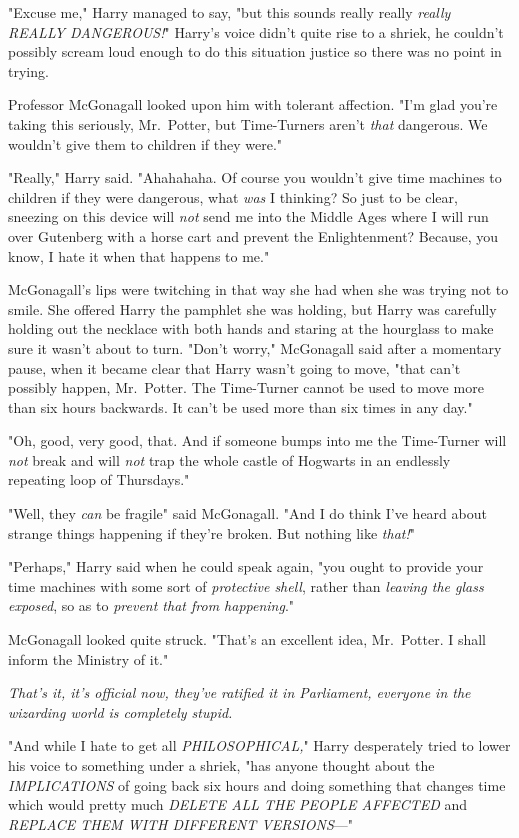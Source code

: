 "Excuse me," Harry managed to say, "but this sounds really really \emph{really
REALLY DANGEROUS!}" Harry's voice didn't quite rise to a shriek, he couldn't
possibly scream loud enough to do this situation justice so there was no point
in trying.

Professor McGonagall looked upon him with tolerant affection. "I'm glad you're
taking this seriously, Mr.~Potter, but Time-Turners aren't \emph{that}
dangerous. We wouldn't give them to children if they were."

"Really," Harry said. "Ahahahaha. Of course you wouldn't give time machines to
children if they were dangerous, what \emph{was} I thinking? So just to be
clear, sneezing on this device will \emph{not} send me into the Middle Ages
where I will run over Gutenberg with a horse cart and prevent the
Enlightenment? Because, you know, I hate it when that happens to me."

McGonagall's lips were twitching in that way she had when she was trying not to
smile. She offered Harry the pamphlet she was holding, but Harry was carefully
holding out the necklace with both hands and staring at the hourglass to make
sure it wasn't about to turn. "Don't worry," McGonagall said after a momentary
pause, when it became clear that Harry wasn't going to move, "that can't
possibly happen, Mr.~Potter. The Time-Turner cannot be used to move more than
six hours backwards. It can't be used more than six times in any day."

"Oh, good, very good, that. And if someone bumps into me the Time-Turner will
\emph{not} break and will \emph{not} trap the whole castle of Hogwarts in an
endlessly repeating loop of Thursdays."

"Well, they \emph{can} be fragile{\el}" said McGonagall. "And I do think
I've heard about strange things happening if they're broken. But nothing like
\emph{that!}"

"Perhaps," Harry said when he could speak again, "you ought to provide your
time machines with some sort of \emph{protective shell}, rather than
\emph{leaving the glass exposed}, so as to \emph{prevent that from happening}."

McGonagall looked quite struck. "That's an excellent idea, Mr.~Potter. I shall
inform the Ministry of it."

\emph{That's it, it's official now, they've ratified it in Parliament, everyone
in the wizarding world is completely stupid.}

"And while I hate to get all \emph{PHILOSOPHICAL,}" Harry desperately tried to
lower his voice to something under a shriek, "has anyone thought about the
\emph{IMPLICATIONS} of going back six hours and doing something that changes
time which would pretty much \emph{DELETE ALL THE PEOPLE AFFECTED} and \emph{
REPLACE THEM WITH DIFFERENT VERSIONS}—"

